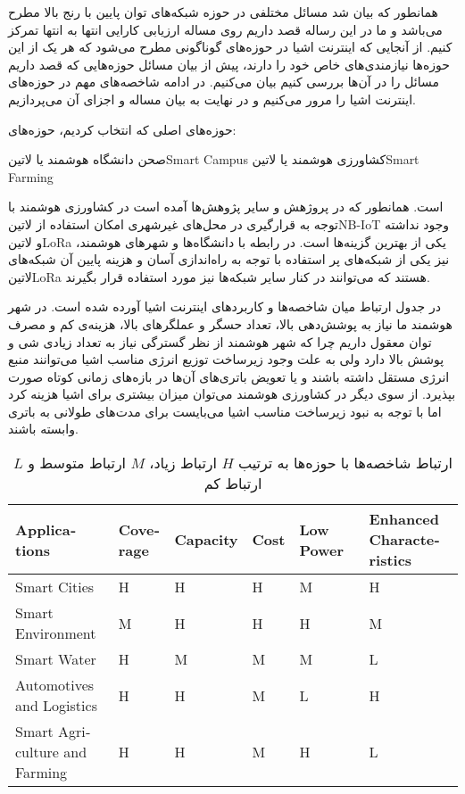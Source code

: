 
همانطور که بیان شد مسائل مختلفی در حوزه شبکه‌های توان پایین با رنج بالا مطرح می‌باشد و ما در این رساله قصد داریم روی مساله ارزیابی کارایی انتها به انتها تمرکز کنیم.
از آنجایی که اینترنت اشیا در حوزه‌های گوناگونی مطرح می‌شود که هر یک از این حوزه‌ها نیازمندی‌های خاص خود را دارند، پیش از بیان مسائل حوزه‌هایی که قصد داریم
مسائل را در آن‌ها بررسی کنیم بیان می‌کنیم. در ادامه شاخصه‌های مهم در حوزه‌های اینترنت اشیا را مرور می‌کنیم و در نهایت به بیان مساله و اجزای آن می‌پردازیم.

حوزه‌های اصلی که انتخاب کردیم، حوزه‌های:

 صحن دانشگاه هوشمند یا ‌لاتین{Smart Campus}
 کشاورزی هوشمند یا ‌لاتین{Smart Farming}

است. همانطور که در پروژهش  و سایر پژوهش‌ها آمده است در کشاورزی هوشمند با توجه به قرارگیری در محل‌های غیرشهری امکان استفاده
از ‌لاتین{NB-IoT} وجود نداشته و ‌لاتین{LoRa} یکی از بهترین گزینه‌ها است.
در رابطه با دانشگاه‌ها و شهرهای هوشمند، نیز یکی از شبکه‌های پر استفاده با توجه به راه‌اندازی آسان و هزینه پایین آن شبکه‌های ‌لاتین{LoRa} هستند
که می‌توانند در کنار سایر شبکه‌ها نیز مورد استفاده قرار بگیرند.

در جدول  ارتباط میان شاخصه‌ها و کاربردهای اینترنت اشیا آورده شده است.
در شهر هوشمند ما نیاز به پوشش‌دهی بالا، تعداد حسگر و عملگرهای بالا، هزینه‌ی کم و مصرف توان معقول داریم چرا
که شهر هوشمند از نظر گسترگی نیاز به تعداد زیادی شی و پوشش بالا دارد ولی به علت وجود زیرساخت توزیع انرژی مناسب
اشیا می‌توانند منبع انرژی مستقل داشته باشند و یا تعویض باتری‌های آن‌ها در بازه‌های زمانی کوتاه صورت بپذیرد.
از سوی دیگر در کشاورزی هوشمند می‌توان میزان بیشتری برای اشیا هزینه کرد اما با توجه به نبود زیرساخت مناسب
اشیا می‌بایست برای مدت‌های طولانی به باتری وابسته باشند.

\begin{table}
\label{جدول: شاخصه‌ها و کاربردها}
\caption{ارتباط شاخصه‌ها با حوزه‌ها به ترتیب $H$ ارتباط زیاد، $M$ ارتباط متوسط و $L$ ارتباط کم }
\begin{latin}\begin{tabularx}
  {\textwidth}
  {|*{6}{X|}}
  \toprule
  Applications &
  Coverage &
  Capacity &
  Cost &
  Low Power &
  Enhanced Characteristics \\
  \midrule
  Smart Cities &
  H &
  H &
  H &
  M &
  H \\
  \midrule
  Smart Environment &
  M &
  H &
  H &
  H &
  M \\
  \midrule
  Smart Water &
  H &
  M &
  M &
  M &
  L \\
  \midrule
  Automotives and Logistics &
  H &
  H &
  M &
  L &
  H \\
  \midrule
  Smart Agriculture and Farming &
  H &
  H &
  M &
  H &
  L \\
  \bottomrule
\end{tabularx}\end{latin}
\end{table}

